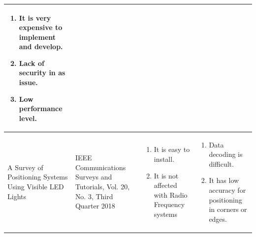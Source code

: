 \documentclass[a4paper, 12pt]{article}
\begin{document}
\begin{tabular}{|p{107pt}|p{107pt}|p{107pt}|p{107pt}|}
	\parbox{107pt}{\raggedright 
		\begin{enumerate}
			\item It is very expensive to implement and develop.
			\item Lack of security in as issue.
			\item Low performance level.
		\end{enumerate}
	} \\
	\hline
	\parbox{107pt}{\raggedright A Survey of Positioning Systems Using Visible LED Lights} & 
	\parbox{107pt}{\raggedright IEEE Communications Surveys and Tutorials, Vol. 20, No. 3, Third Quarter 2018} & 
	\parbox{107pt}{\raggedright 
		\begin{enumerate}
			\item It is easy to install.
			\item It is not affected with Radio Frequency systems
		\end{enumerate}
	} & \parbox{107pt}{\raggedright 
		\begin{enumerate}
			\item Data decoding is difficult.
			\item It has low accuracy for positioning in corners or edges.
	\end{enumerate}} \\
	\hline
\end{tabular}
\vspace{2pt}

\pagebreak
\end{document}

